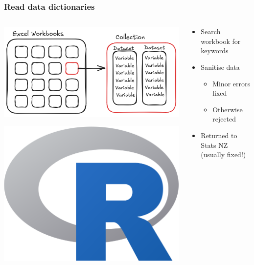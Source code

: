 \documentclass[aspectratio=169]{beamer}
\begin{document}
\begin{frame}
    \frametitle{Read data dictionaries}

    \begin{columns}
        \begin{column}{0.5\textwidth}
        \begin{center}
            \includegraphics[width=\linewidth]{dd-workflow.png}
        \end{center}
        \includegraphics[width=0.2\linewidth]{rlogo.png}
    \end{column}

    \begin{column}{0.5\textwidth}
        \begin{itemize}
            \item Search workbook for keywords
            \item Sanitise data
            \begin{itemize}
                \item Minor errors fixed
                \item Otherwise rejected
            \end{itemize}
            \item Returned to Stats NZ (usually fixed!)
        \end{itemize}

    \end{column}
    \end{columns}
\end{frame}
\end{document}
